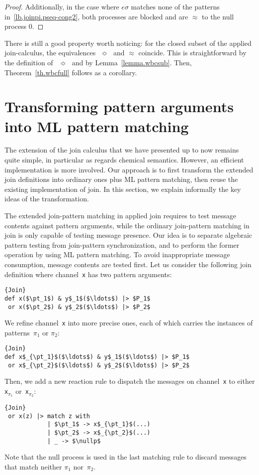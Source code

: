 \documentclass{LMCS}
\let \lst \lstinline
\newcommand{\forget}[1]{}
\newcommand{\pt}{\pi}
\renewcommand{\_}{\mathord{\rule[-.25ex]{1ex}{.15ex}}}
\newcommand{\nullp}{0}
\newcommand{\wbc}{\mathrel{\approx}}
\newcommand{\pseq}{\;\mathop{\Bumpeq}\;}
\begin{document}
\begin{proof}
  Additionally, in the case where $e\sigma$ matches none of the patterns
  in~\eqref{lb.joinpi.pseq-cong2}, both processes are blocked
  and are $\wbc$ to the null process $\nullp$. \forget{\qed}
\end{proof}

There is still a good property worth noticing: for the closed
subset of the applied join-calculus,  the equivalences $\pseq$ and $\wbc$
coincide. This is straightforward by the definition of~$\pseq$
and by Lemma~\ref{lemma.wbcsub}.
Then, Theorem~\ref{th.wbcfull} follows as a corollary.

\section{Transforming pattern arguments into ML pattern matching}
\label{sec.trans-idea}

The extension of the join calculus that we have presented up to now
remains quite  simple, in particular as regards chemical
semantics. However, an efficient implementation is more involved. Our
approach is to first transform the extended join definitions into
ordinary ones plus ML pattern matching, then reuse the existing
implementation of join. In this section, we explain informally the
key ideas of the transformation.

The extended join-pattern matching in applied join requires to test
message contents against pattern arguments, while the ordinary
join-pattern matching in join is only capable of testing message
presence.  Our idea is to separate algebraic pattern testing from
join-pattern synchronization, and to perform the former operation by
using ML pattern matching.  To avoid inappropriate message
consumption, message contents are tested first.  Let us consider the
following join definition where channel~\lst"x" has two pattern
arguments:
\begin{lstlisting}{Join}
def x($\pt_1$) & y$_1$($\ldots$) |> $P_1$
 or x($\pt_2$) & y$_2$($\ldots$) |> $P_2$
\end{lstlisting}
We refine channel~\lst"x" into more precise ones, each
of which carries the instances of patterns~$\pt_1$ or $\pt_2$:
\begin{lstlisting}{Join}
def x$_{\pt_1}$($\ldots$) & y$_1$($\ldots$) |> $P_1$
 or x$_{\pt_2}$($\ldots$) & y$_2$($\ldots$) |> $P_2$
\end{lstlisting}
Then, we add a new reaction rule to dispatch the messages on
channel~\lst"x" to either \lst"x"$_{\pt_1}$ or~\lst"x"$_{\pt_2}$:
\begin{lstlisting}{Join}
 or x(z) |> match z with
            | $\pt_1$ -> x$_{\pt_1}$(...)
            | $\pt_2$ -> x$_{\pt_2}$(...)
            | _ -> $\nullp$
\end{lstlisting}
Note that the null process is used in the last matching rule to discard
messages that match neither $\pt_1$ nor~$\pt_2$.
\end{document}
